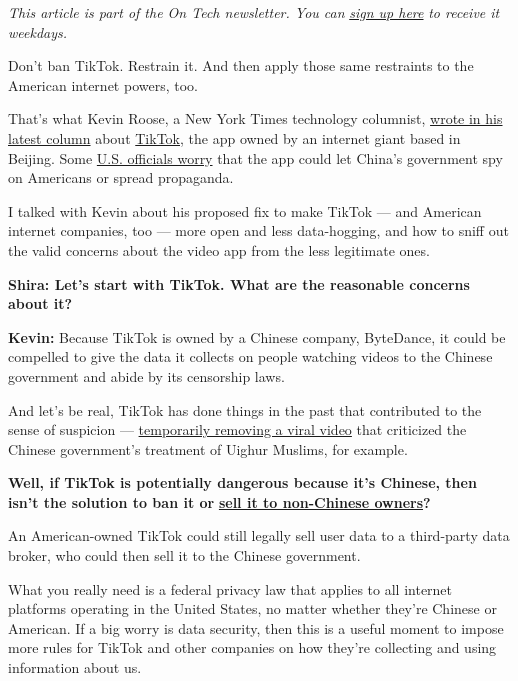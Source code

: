\emph{This article is part of the On Tech newsletter. You can}
\href{https://www.nytimes3xbfgragh.onion/newsletters/signup/OT}{\emph{sign
up here}} \emph{to receive it weekdays.}

Don't ban TikTok. Restrain it. And then apply those same restraints to
the American internet powers, too.

That's what Kevin Roose, a New York Times technology columnist,
\href{https://www.nytimes3xbfgragh.onion/2020/07/26/technology/tiktok-china-ban-model.html}{wrote
in his latest column} about
\href{https://www.nytimes3xbfgragh.onion/2020/08/03/technology/trump-tiktok-microsoft.html}{TikTok},
the app owned by an internet giant based in Beijing. Some
\href{https://www.nytimes3xbfgragh.onion/2020/07/15/technology/tiktok-washington-lobbyist.html}{U.S.
officials worry} that the app could let China's government spy on
Americans or spread propaganda.

I talked with Kevin about his proposed fix to make TikTok --- and
American internet companies, too --- more open and less data-hogging,
and how to sniff out the valid concerns about the video app from the
less legitimate ones.

\textbf{Shira: Let's start with TikTok. What are the reasonable concerns
about it?}

\textbf{Kevin:} Because TikTok is owned by a Chinese company, ByteDance,
it could be compelled to give the data it collects on people watching
videos to the Chinese government and abide by its censorship laws.

And let's be real, TikTok has done things in the past that contributed
to the sense of suspicion ---
\href{https://www.bloomberg.com/news/articles/2019-11-28/tiktok-restores-account-of-user-who-criticized-china-on-uighurs}{temporarily
removing a viral video} that criticized the Chinese government's
treatment of Uighur Muslims, for example.

\textbf{Well, if TikTok is potentially dangerous because it's Chinese,
then isn't the solution to ban it or}
\textbf{\href{https://www.nytimes3xbfgragh.onion/2020/07/23/business/dealbook/tiktok-bytedance-investors-trump.html}{sell
it to non-Chinese owners}?}

An American-owned TikTok could still legally sell user data to a
third-party data broker, who could then sell it to the Chinese
government.

What you really need is a federal privacy law that applies to all
internet platforms operating in the United States, no matter whether
they're Chinese or American. If a big worry is data security, then this
is a useful moment to impose more rules for TikTok and other companies
on how they're collecting and using information about us.

